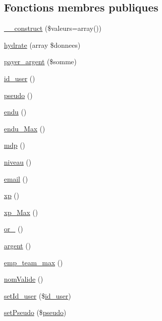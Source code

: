 \subsection*{Fonctions membres publiques}
\begin{DoxyCompactItemize}
\item 
\mbox{\hyperlink{class_user_ae07b9dba276956c8b8f89c8c46ff6af5}{\+\_\+\+\_\+construct}} (\$valeurs=array())
\item 
\mbox{\hyperlink{class_user_a6a8c32b1e008d4bbda256614aea7e21b}{hydrate}} (array \$donnees)
\item 
\mbox{\hyperlink{class_user_ad1c97f448cd6d5258f4b1ab9f36172ed}{payer\+\_\+argent}} (\$somme)
\item 
\mbox{\hyperlink{class_user_acca0b7b0795d518d884a25505add943c}{id\+\_\+user}} ()
\item 
\mbox{\hyperlink{class_user_a5589abfe412eaa4755f3c984729802b7}{pseudo}} ()
\item 
\mbox{\hyperlink{class_user_aa7ae3e562d611c4cf112a618db183660}{endu}} ()
\item 
\mbox{\hyperlink{class_user_a3c4f83665c4b093ac23cb1ef8c962b4e}{endu\+\_\+\+Max}} ()
\item 
\mbox{\hyperlink{class_user_a11525bb64e691e68ccb43856433f5e71}{mdp}} ()
\item 
\mbox{\hyperlink{class_user_ab341c8493decd7ed8ad872544a3b3332}{niveau}} ()
\item 
\mbox{\hyperlink{class_user_afffcb74b0fe718305661fb57d5fdfde0}{email}} ()
\item 
\mbox{\hyperlink{class_user_abc7ddb8ce5c319d13e15734bee03075b}{xp}} ()
\item 
\mbox{\hyperlink{class_user_a2826726689d756f84814487cf2823040}{xp\+\_\+\+Max}} ()
\item 
\mbox{\hyperlink{class_user_a1323f270a1285588987ef21bf704975c}{or\+\_\+}} ()
\item 
\mbox{\hyperlink{class_user_a2a6a97a5e1ddb08da30802aec1b0eb0a}{argent}} ()
\item 
\mbox{\hyperlink{class_user_aa4d14a670efb836bee049266a044d818}{emp\+\_\+team\+\_\+max}} ()
\item 
\mbox{\hyperlink{class_user_a786a3c86445a30cddb0e1d4b73f133ec}{nom\+Valide}} ()
\item 
\mbox{\hyperlink{class_user_ab72d9e4455c1813e3be5a8d422b2812d}{set\+Id\+\_\+user}} (\$\mbox{\hyperlink{class_user_acca0b7b0795d518d884a25505add943c}{id\+\_\+user}})
\item 
\mbox{\hyperlink{class_user_afa0f13589eb9cdaca9a8192d245fd75f}{set\+Pseudo}} (\$\mbox{\hyperlink{class_user_a5589abfe412eaa4755f3c984729802b7}{pseudo}})

\end{DoxyCompactItemize}
